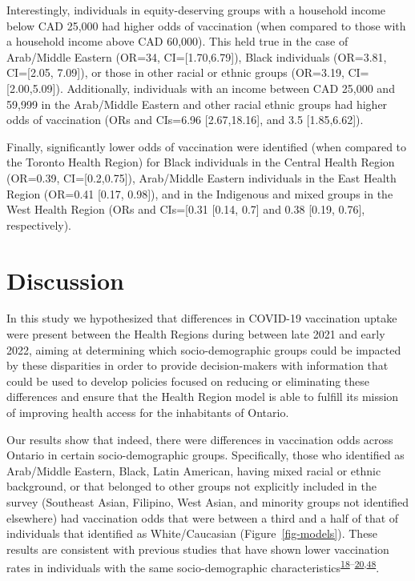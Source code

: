 \documentclass[
  letterpaper,
  DIV=11,
  numbers=noendperiod]{scrartcl}
\begin{document}
Interestingly, individuals in equity-deserving groups with a household
income below CAD 25,000 had higher odds of vaccination (when compared to
those with a household income above CAD 60,000). This held true in the
case of Arab/Middle Eastern (OR=34, CI={[}1.70,6.79{]}), Black
individuals (OR=3.81, CI={[}2.05, 7.09{]}), or those in other racial or
ethnic groups (OR=3.19, CI={[}2.00,5.09{]}). Additionally, individuals
with an income between CAD 25,000 and 59,999 in the Arab/Middle Eastern
and other racial ethnic groups had higher odds of vaccination (ORs and
CIs=6.96 {[}2.67,18.16{]}, and 3.5 {[}1.85,6.62{]}).

Finally, significantly lower odds of vaccination were identified (when
compared to the Toronto Health Region) for Black individuals in the
Central Health Region (OR=0.39, CI={[}0.2,0.75{]}), Arab/Middle Eastern
individuals in the East Health Region (OR=0.41 {[}0.17, 0.98{]}), and in
the Indigenous and mixed groups in the West Health Region (ORs and
CIs={[}0.31 {[}0.14, 0.7{]} and 0.38 {[}0.19, 0.76{]}, respectively).

\hypertarget{discussion}{%
\section{Discussion}\label{discussion}}

In this study we hypothesized that differences in COVID-19 vaccination
uptake were present between the Health Regions during between late 2021
and early 2022, aiming at determining which socio-demographic groups
could be impacted by these disparities in order to provide
decision-makers with information that could be used to develop policies
focused on reducing or eliminating these differences and ensure that the
Health Region model is able to fulfill its mission of improving health
access for the inhabitants of Ontario.

Our results show that indeed, there were differences in vaccination odds
across Ontario in certain socio-demographic groups. Specifically, those
who identified as Arab/Middle Eastern, Black, Latin American, having
mixed racial or ethnic background, or that belonged to other groups not
explicitly included in the survey (Southeast Asian, Filipino, West
Asian, and minority groups not identified elsewhere) had vaccination
odds that were between a third and a half of that of individuals that
identified as White/Caucasian (Figure~\ref{fig-models}). These results
are consistent with previous studies that have shown lower vaccination
rates in individuals with the same socio-demographic
characteristics\textsuperscript{\protect\hyperlink{ref-guay2022}{18}--\protect\hyperlink{ref-hussain2022}{20},\protect\hyperlink{ref-carter2022}{48}}.
\end{document}
